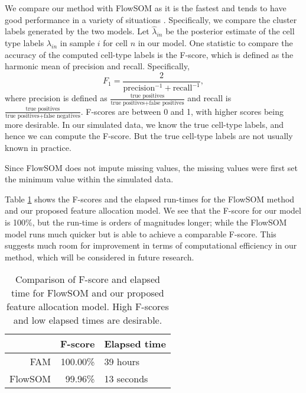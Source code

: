 \documentclass[12pt,]{article}
\newcommand{\true}{{\mbox{\tiny TR}}}
\begin{document}

We compare our method with FlowSOM as it is the fastest and tends to have good
performance in a variety of situations \citep{weber2016comparison}.
Specifically, we compare the cluster labels generated by the two models.
Let $\hat \lambda_{in}$ be the posterior estimate of the cell type labels
$\lambda_{in}$ in sample $i$ for cell $n$ in our model. 
One statistic to compare the accuracy of the computed cell-type labels is
the F-score, which is defined as the harmonic mean of precision and recall.
Specifically,
$$
F_1 = \frac{2}{\text{precision}^{-1} + \text{recall}^{-1}},
$$
where precision is defined as $\frac{\text{true positives}}{\text{true
positives} + \text{false positives}}$ and recall is $\frac{\text{true
positives}}{\text{true positives} + \text{false negatives}}$.  F-scores are
between 0 and 1, with higher scores being more desirable. In our simulated
data, we know the true cell-type labels, and hence we can compute the F-score.
But the true cell-type labels are not usually known in practice.

Since FlowSOM does not impute missing values, the missing values were
first set the minimum value within the simulated data.

Table \ref{tab:fscores} shows the F-scores and the elapsed run-times 
for the FlowSOM method and our proposed feature allocation model.
We see that the F-score for our model is 100\%, but the run-time is 
orders of magnitudes longer; while the FlowSOM model runs much quicker
but is able to achieve a comparable F-score. This suggests much
room for improvement in terms of computational efficiency in 
our method, which will be considered in future research.

\begin{table}[H]
\centering
\begin{tabular}{rrl}
  \hline
  & F-score & Elapsed time \\
  \hline
  FAM & 100.00\% & 39 hours \\
  FlowSOM & 99.96\% & 13 seconds \\
  \hline
\end{tabular}
\label{tab:fscores}
\caption{Comparison of F-score and elapsed time for FlowSOM and our proposed
feature allocation model. High F-scores and low elapsed times are desirable.}
\end{table}
\end{document}
